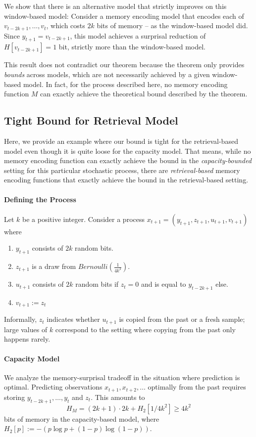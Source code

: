 \documentclass[11pt,letterpaper]{article}
\newcounter{theorem}
\begin{document}
We show that there is an alternative model that strictly improves on this window-based model:
Consider a memory encoding model that encodes each of $v_{t-2k+1}, \dots, v_{t}$, which costs $2k$ bits of memory -- as the window-based model did.
Since $y_{t+1} = v_{t-2k+1}$, this model achieves a surprisal reduction of $H[v_{t-2k+1}] = 1$ bit, strictly more than the window-based model.


This result does not contradict our theorem because the theorem only provides \emph{bounds} across models, which are not necessarily achieved by a given window-based model.
In fact, for the process described here, no memory encoding function $M$ can exactly achieve the theoretical bound described by the theorem.



\subsection{Tight Bound for Retrieval Model}

Here, we provide an example where our bound is tight for the retrieval-based model even though it is quite loose for the capacity model.
That means, while no memory encoding function can exactly achieve the bound in the \emph{capacity-bounded} setting for this particular stochastic process, there are \emph{retrieval-based} memory encoding functions that exactly achieve the bound in the retrieval-based setting.

\paragraph{Defining the Process}
Let $k$ be a positive integer.
Consider a process $x_{t+1} = (y_{t+1}, z_{t+1}, u_{t+1}, v_{t+1})$ where
\begin{enumerate}
    \item $y_{t+1}$ consists of $2k$ random bits.
    \item $z_{t+1}$ is a draw from $Bernoulli(\frac{1}{4k^2})$.
    \item $u_{t+1}$ consists of $2k$ random bits if $z_t = 0$ and is equal to $y_{t-2k+1}$ else.
    \item $v_{t+1} := z_t$ 
\end{enumerate}
Informally, $z_t$ indicates whether $u_{t+1}$ is copied from the past or a fresh sample; large values of $k$ correspond to the setting where copying from the past only happens rarely.

\paragraph{Capacity Model}
We analyze the memory-surprisal tradeoff in the situation where prediction is optimal.
Predicting observations $x_{t+1}, x_{t+2}, \dots$ optimally from the past requires storing $y_{t-2k+1}, \dots, y_{t}$ and $z_t$.
This amounts to
\begin{equation}
    H_M = (2k+1)\cdot 2k + H_2[1/4k^2] \geq 4k^2
\end{equation} 
bits of memory in the capacity-based model, where $H_2[p] := -(p\log p + (1-p) \log (1-p))$.
\end{document}
